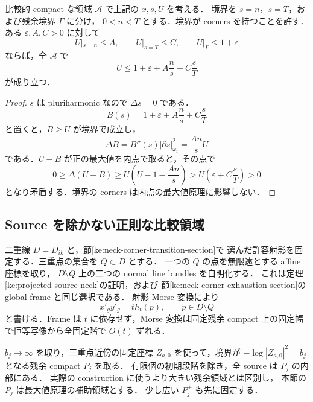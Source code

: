 \begin{lemma}[二つの端の粗い上界を吸収する障壁]
\label{ke:normal-harmonic-depth-barrier}
比較的 compact な領域 $\mathcal A$ で上記の $x,s,U$ を考える．
境界を $s=n$，$s=T$，および残余境界 $\Gamma$ に分け，
$0<n<T$ とする．境界が corners を持つことを許す．
ある $\varepsilon,A,C>0$ に対して
\[
 U|_{s=n}\le A,\qquad U|_{s=T}\le C,
 \qquad U|_\Gamma\le1+\varepsilon
\]
ならば，全 $\mathcal A$ で
\begin{equation}\label{ke:eq:normal-harmonic-depth-barrier}
 U\le1+\varepsilon+A\frac ns+C\frac sT
\end{equation}
が成り立つ．
\end{lemma}

\begin{proof}
$s$ は pluriharmonic なので $\Delta s=0$ である．
\[
 B(s)=1+\varepsilon+A\frac ns+C\frac sT
\]
と置くと，$B\ge U$ が境界で成立し，
\[
 \Delta B=B''(s)|\partial s|_{\omega_t}^2
          =\frac{An}{s}U
\]
である．$U-B$ が正の最大値を内点で取ると，その点で
\[
 0\ge\Delta(U-B)
 \ge U\left(U-1-\frac{An}{s}\right)
 >U\left(\varepsilon+C\frac sT\right)>0
\]
となり矛盾する．境界の corners は内点の最大値原理に影響しない．
\end{proof}

\subsection{Source を除かない正則な比較領域}

二重線 $D=D_{ik}$ と，節\ref{ke:neck-corner-transition-section}で
選んだ許容射影を固定する．三重点の集合を $Q\subset D$ とする．
一つの $Q$ の点を無限遠とする affine 座標を取り，
$D\setminus Q$ 上の二つの normal line bundles を自明化する．
これは定理\ref{ke:projected-source-neck}の証明，および
節\ref{ke:neck-corner-exhaustion-section}の global frame と同じ選択である．
射影 Morse 変換により
\begin{equation}\label{ke:eq:sharp-normal-global-chart}
 x'_g y'_g=t h_t(p),\qquad p\in D\setminus Q
\end{equation}
と書ける．Frame は $t$ に依存せず，Morse 変換は固定残余 compact
上の固定幅で恒等写像から全固定階で $O(t)$ ずれる．

$b_j\to\infty$ を取り，三重点近傍の固定座標
$Z_{a,0}$ を使って，境界が
$-\log|Z_{a,0}|^2=b_j$ となる残余 compact $P_j$ を取る．
有限個の初期段階を除き，全 source は $P_j$ の内部にある．
実際の construction に使うより大きい残余領域とは区別し，
本節の $P_j$ は最大値原理の補助領域とする．
少し広い $P_j^+$ も先に固定する．

